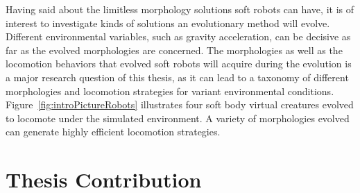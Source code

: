Having said about the limitless morphology solutions soft robots can have, it is of interest to investigate kinds of solutions an evolutionary method will evolve. Different environmental variables, such as gravity acceleration, can be decisive as far as the evolved morphologies are concerned. The morphologies as well as the locomotion behaviors that evolved soft robots will acquire during the evolution is a major research question of this thesis, as it can lead to a taxonomy of different morphologies and locomotion strategies for variant environmental conditions. Figure~\ref{fig:introPictureRobots} illustrates four soft body virtual creatures evolved to locomote under the simulated environment. A variety of morphologies evolved can generate highly efficient locomotion strategies.


\section{Thesis Contribution}

